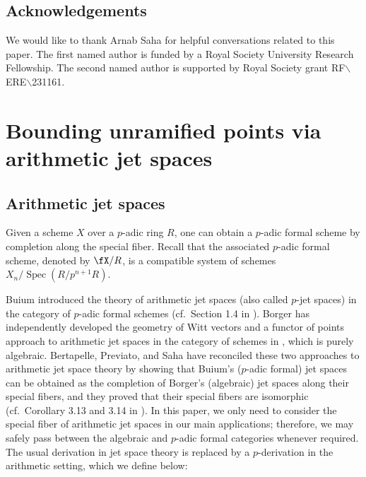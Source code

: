 \documentclass[11pt]{amsart}
\theoremstyle{plain}
\theoremstyle{definition}
\DeclareMathOperator{\Spec}{\mathrm{Spec}}
\newcommand{\netan}[1]{{\color{blue} \sf $\clubsuit\clubsuit\clubsuit$ Netan: [#1]}}
\newcommand{\sudip}[1]{{\color{purple} \sf $\clubsuit\clubsuit\clubsuit$ Sudip: [#1]}}
\begin{document}
\subsection{Acknowledgements}
We would like to thank Arnab Saha for helpful conversations related to this paper. The first named author is funded by a Royal Society University Research Fellowship. The second named author is supported by Royal Society grant  RF$\backslash$ERE$\backslash$231161.

\section{Bounding unramified points via arithmetic jet spaces}\label{sec:1}
\subsection{Arithmetic jet spaces}
Given a scheme $X$ over a $p$-adic ring $R$, one can obtain a $p$-adic formal scheme by completion along the special fiber. Recall that the associated $p$-adic formal scheme, denoted by $\fX/R$, is a compatible system of schemes $X_{n}/\Spec(R/p^{n+1}R)$.


Buium introduced the theory of arithmetic jet spaces (also called $p$-jet spaces) in the category of $p$-adic formal schemes (cf.\ Section 1.4 in \cite{buium:96, buium:95}). Borger has independently developed the geometry of Witt vectors and a functor of points approach to arithmetic jet spaces in the category of schemes in \cite{bor1} \cite{bor2}, which is purely algebraic. Bertapelle, Previato, and Saha have reconciled these two approaches to arithmetic jet space theory by showing that Buium's ($p$-adic formal) jet spaces can be obtained as the completion of Borger's (algebraic) jet spaces along their special fibers, and they proved that their special fibers are isomorphic (cf.\ Corollary 3.13 and 3.14 in \cite{BPS}). In this paper, we only need to consider the special fiber of arithmetic jet spaces in our main applications; therefore, we may safely pass between the algebraic and $p$-adic formal categories whenever required. The usual derivation in jet space theory is replaced by a $p$-derivation in the arithmetic setting, which we define below:
\end{document}
